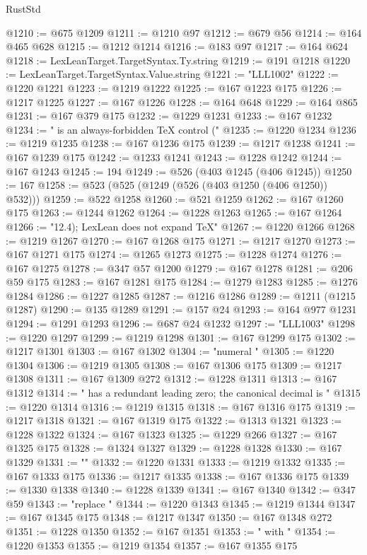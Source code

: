 \begin{lexlean}{RustStd}
\begin{coremodule}
{\begin{coremodule}
{{{{{{{{{{{{{{{{{{{{{{{{{{{{{{{{{{@1210 := @675 @1209
@1211 := @1210 @97
@1212 := @679 @56
@1214 := @164 @465 @628
@1215 := @1212 @1214
@1216 := @183 @97
@1217 := @164 @624
@1218 := LexLeanTarget.TargetSyntax.Ty.string
@1219 := @191 @1218
@1220 := LexLeanTarget.TargetSyntax.Value.string
@1221 := "LLL1002"
@1222 := @1220 @1221
@1223 := @1219 @1222
@1225 := @167 @1223 @175
@1226 := @1217 @1225
@1227 := @167 @1226
@1228 := @164 @648
@1229 := @164 @865
@1231 := @167 @379 @175
@1232 := @1229 @1231
@1233 := @167 @1232
@1234 := " is an always-forbidden TeX control ("
@1235 := @1220 @1234
@1236 := @1219 @1235
@1238 := @167 @1236 @175
@1239 := @1217 @1238
@1241 := @167 @1239 @175
@1242 := @1233 @1241
@1243 := @1228 @1242
@1244 := @167 @1243
@1245 := 194
@1249 := @526 (@403 @1245 (@406 @1245))
@1250 := 167
@1258 := @523 (@525 (@1249 (@526 (@403 @1250 (@406 @1250)) @532)))
@1259 := @522 @1258
@1260 := @521 @1259
@1262 := @167 @1260 @175
@1263 := @1244 @1262
@1264 := @1228 @1263
@1265 := @167 @1264
@1266 := "12.4); LexLean does not expand TeX"
@1267 := @1220 @1266
@1268 := @1219 @1267
@1270 := @167 @1268 @175
@1271 := @1217 @1270
@1273 := @167 @1271 @175
@1274 := @1265 @1273
@1275 := @1228 @1274
@1276 := @167 @1275
@1278 := @347 @57 @1200
@1279 := @167 @1278
@1281 := @206 @59 @175
@1283 := @167 @1281 @175
@1284 := @1279 @1283
@1285 := @1276 @1284
@1286 := @1227 @1285
@1287 := @1216 @1286
@1289 := @1211 (@1215 @1287)
@1290 := @135 @1289
@1291 := @157 @24
@1293 := @164 @977 @1231
@1294 := @1291 @1293
@1296 := @687 @24 @1232
@1297 := "LLL1003"
@1298 := @1220 @1297
@1299 := @1219 @1298
@1301 := @167 @1299 @175
@1302 := @1217 @1301
@1303 := @167 @1302
@1304 := "numeral "
@1305 := @1220 @1304
@1306 := @1219 @1305
@1308 := @167 @1306 @175
@1309 := @1217 @1308
@1311 := @167 @1309 @272
@1312 := @1228 @1311
@1313 := @167 @1312
@1314 := " has a redundant leading zero; the canonical decimal is "
@1315 := @1220 @1314
@1316 := @1219 @1315
@1318 := @167 @1316 @175
@1319 := @1217 @1318
@1321 := @167 @1319 @175
@1322 := @1313 @1321
@1323 := @1228 @1322
@1324 := @167 @1323
@1325 := @1229 @266
@1327 := @167 @1325 @175
@1328 := @1324 @1327
@1329 := @1228 @1328
@1330 := @167 @1329
@1331 := ""
@1332 := @1220 @1331
@1333 := @1219 @1332
@1335 := @167 @1333 @175
@1336 := @1217 @1335
@1338 := @167 @1336 @175
@1339 := @1330 @1338
@1340 := @1228 @1339
@1341 := @167 @1340
@1342 := @347 @59
@1343 := "replace "
@1344 := @1220 @1343
@1345 := @1219 @1344
@1347 := @167 @1345 @175
@1348 := @1217 @1347
@1350 := @167 @1348 @272
@1351 := @1228 @1350
@1352 := @167 @1351
@1353 := " with "
@1354 := @1220 @1353
@1355 := @1219 @1354
@1357 := @167 @1355 @175
}}}}}}}}}}}}}}}}}}}}}}}}}}}}}}}}}}
\end{coremodule}}
\end{coremodule}
\end{lexlean}
